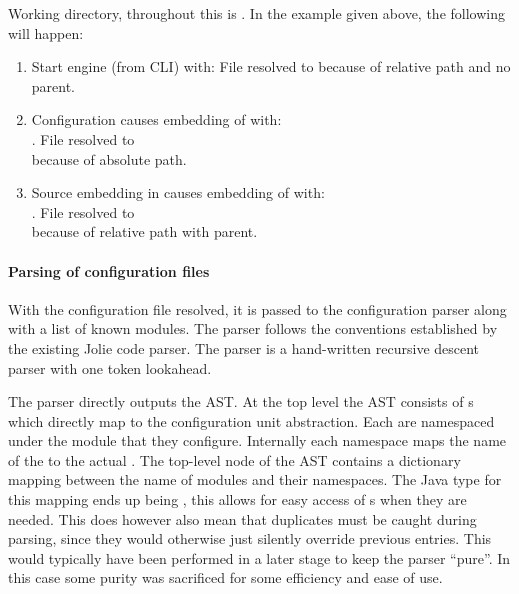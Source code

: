 Working directory, throughout this is . In the example given above,
the following will happen:

\begin{enumerate}

\item Start engine (from CLI) with: 
File resolved to  because of relative path and no parent.

\item Configuration causes embedding of  with:
\\. File resolved to
\\ because of absolute path.

\item Source embedding in  causes embedding of 
with: \\. File resolved
to \\ because of relative path with parent.

\end{enumerate}

\paragraph{Parsing of configuration files}

With the configuration file resolved, it is passed to the configuration parser
along with a list of known modules. The parser follows the conventions
established by the existing Jolie code parser. The parser is a hand-written
recursive descent parser with one token lookahead.

The parser directly outputs the AST. At the top level the AST consists of
s which directly map to the configuration unit abstraction. Each
 are namespaced under the module that they configure. Internally
each namespace maps the name of the  to the actual
. The top-level node of the AST contains a dictionary mapping
between the name of modules and their namespaces. The Java type for this
mapping ends up being , this allows for
easy access of s when they are needed. This does however also
mean that duplicates must be caught during parsing, since they would otherwise
just silently override previous entries. This would typically have been
performed in a later stage to keep the parser ``pure''. In this case some
purity was sacrificed for some efficiency and ease of use.

